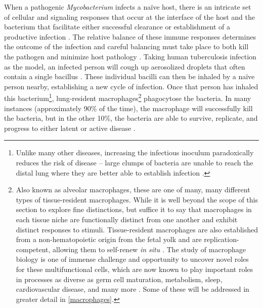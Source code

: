 When a pathogenic \textit{Mycobacterium} infects a na\"{i}ve host, there is an intricate set of cellular and signaling responses that occur at the interface of the host and the bacterium that facilitate either successful clearance or establishment of a productive infection \citep{Davies2001b, Bohrer2021, Gagneux2006a, Turner2017}. The relative balance of these immune responses determines the outcome of the infection and careful balancing must take place to both kill the pathogen and minimize host pathology \citep{Casadevall2003}. Taking human tuberculosis infection as the model, an infected person will cough up aerosolized droplets that often contain a single bacillus \citep{Churchyard2017, Mathema2017}. These individual bacilli can then be inhaled by a na\"{i}ve person nearby, establishing a new cycle of infection. Once that person has inhaled this bacterium\footnote{Unlike many other diseases, increasing the infectious inoculum paradoxically reduces the risk of disease -- large clumps of bacteria are unable to reach the distal lung where they are better able to establish infection \citep{Cambier2014b}.}, lung\hyp{}resident macrophages\footnote{Also known as alveolar macrophages, these are one of many, many different types of tissue\hyp{}resident macrophages. While it is well beyond the scope of this section to explore fine distinctions, but suffice it to say that macrophages in each tissue niche are functionally distinct from one another and exhibit distinct responses to stimuli. Tissue\hyp{}resident macrophages are also established from a non\hyp{}hematopoietic origin from the fetal yolk and are replication\hyp{}competent, allowing them to self\hyp{}renew \textit{in situ} \citep{Davies2013a, Davies2013b, Epelman2014, Ginhoux2014, Ginhoux2016}. The study of macrophage biology is one of immense challenge and opportunity to uncover novel roles for these multifunctional cells, which are now known to play important roles in processes as diverse as germ cell maturation, metabolism, sleep, cardiovascular disease, and many more \citep{Davies2013a, Hussell2014}. Some of these will be addressed in greater detail in \autoref{macrophages}.} phagocytose the bacteria. In many instances (approximately 90\% of the time), the macrophage will successfully kill the bacteria, but in the other 10\%, the bacteria are able to survive, replicate, and progress to either latent or active disease \citep{Kroidl2022, Verrall2014, North2004}.

